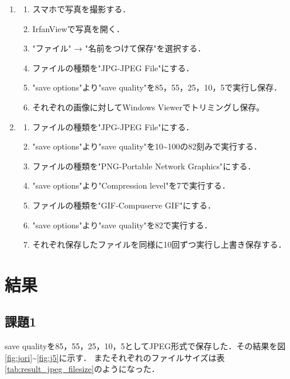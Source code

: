 \documentclass[a4paper,11pt]{bxjsarticle}
\begin{document}
\begin{enumerate}
  \item \begin{enumerate}
          \item スマホで写真を撮影する．
          \item IrfanViewで写真を開く．
          \item "ファイル" → "名前をつけて保存"を選択する．
          \item ファイルの種類を"JPG-JPEG File"にする．
          \item "save options"より"save quality"を85，55，25，10，5で実行し保存．
          \item それぞれの画像に対してWindows Viewerでトリミングし保存。
        \end{enumerate}
  \item \begin{enumerate}
          \item ファイルの種類を"JPG-JPEG File"にする．
          \item "save options"より"save quality"を10\textasciitilde100の82刻みで実行する．
          \item ファイルの種類を"PNG-Portable Network Graphics"にする．
          \item "save options"より"Compression level"を7で実行する．
          \item ファイルの種類を"GIF-Compuserve GIF"にする．
          \item "save options"より"save quality"を82で実行する．
          \item それぞれ保存したファイルを同様に10回ずつ実行し上書き保存する．
        \end{enumerate}
\end{enumerate}

\section{結果}
  \subsection{課題1}
  save qualityを85，55，25，10，5としてJPEG形式で保存した．その結果を図\ref{fig:jori}\textasciitilde\ref{fig:j5}に示す．
  またそれぞれのファイルサイズは表\ref{tab:result_jpeg_filesize}のようになった．
\end{document}
